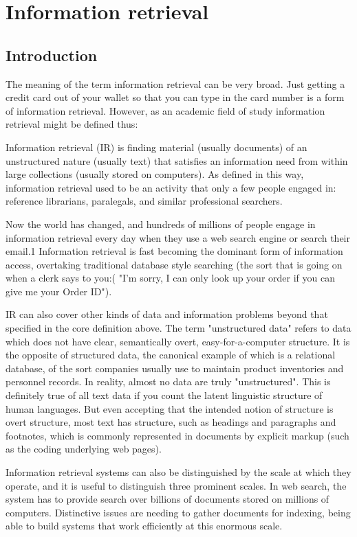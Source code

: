 \section{Information retrieval}  

\subsection{Introduction}


The meaning of the term information retrieval can be very broad. Just getting a credit card out of your wallet so that you can type in the card number is a form of information retrieval. However, as an academic field of study information retrieval might be defined thus: 

Information retrieval (IR) is finding material (usually documents) of an unstructured nature (usually text) that satisfies an information need from within large collections (usually stored on computers). As defined in this way, information retrieval used to be an activity that only a few people engaged in: reference librarians, paralegals, and similar professional searchers.

Now the world has changed, and hundreds of millions of people engage in information retrieval every day when they use a web search engine or search their email.1 Information retrieval is fast becoming the dominant form of information access, overtaking traditional database style searching (the sort that is going on when a clerk says to you:( "I'm sorry, I can only look up your order if you can give me your Order ID").
 
IR can also cover other kinds of data and information problems beyond that specified in the core definition above. The term "unstructured data" refers to data which does not have clear, semantically overt, easy-for-a-computer structure. It is the opposite of structured data, the canonical example of which is a relational database, of the sort companies usually use to maintain product inventories and personnel records. In reality, almost no data are truly "unstructured". This is definitely true of all text data if you count the latent linguistic structure of human languages. But even accepting that the intended notion of structure is overt structure, most text has structure, such as headings and paragraphs and footnotes, which is commonly represented in documents by explicit markup (such as the coding underlying web pages).

Information retrieval systems can also be distinguished by the scale at which they operate, and it is useful to distinguish three prominent scales.
In web search, the system has to provide search over billions of documents stored on millions of computers. Distinctive issues are needing to gather documents for indexing, being able to build systems that work efficiently at this enormous scale.




